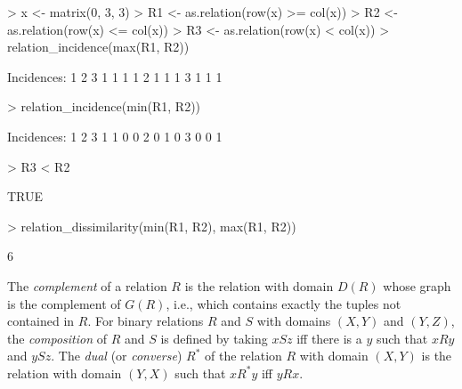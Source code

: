 \documentclass[fleqn]{article}
\begin{document}
\begin{Schunk}
\begin{Sinput}
> x <- matrix(0, 3, 3)
> R1 <- as.relation(row(x) >= col(x))
> R2 <- as.relation(row(x) <= col(x))
> R3 <- as.relation(row(x) < col(x))
> relation_incidence(max(R1, R2))
\end{Sinput}
\begin{Soutput}
Incidences:
  1 2 3
1 1 1 1
2 1 1 1
3 1 1 1
\end{Soutput}
\begin{Sinput}
> relation_incidence(min(R1, R2))
\end{Sinput}
\begin{Soutput}
Incidences:
  1 2 3
1 1 0 0
2 0 1 0
3 0 0 1
\end{Soutput}
\begin{Sinput}
> R3 < R2
\end{Sinput}
\begin{Soutput}
[1] TRUE
\end{Soutput}
\begin{Sinput}
> relation_dissimilarity(min(R1, R2), max(R1, R2))
\end{Sinput}
\begin{Soutput}
     [,1]
[1,]    6
\end{Soutput}
\end{Schunk}

The \emph{complement} of a relation $R$ is the relation with
domain $D(R)$ whose graph is the complement of $G(R)$, i.e.,
which contains exactly the tuples not contained in $R$.
For binary relations $R$
and $S$ with domains $(X, Y)$ and $(Y, Z)$, the
\emph{composition} of $R$ and $S$ is defined by taking
$x S z$ iff there is a $y$ such that $x R y$ and
$y S z$.  The \emph{dual} (or \emph{converse}) $R^*$ of the
relation $R$ with domain $(X, Y)$ is the relation with domain
$(Y, X)$ such that $x R^* y$ iff $y R x$.


\end{document}
